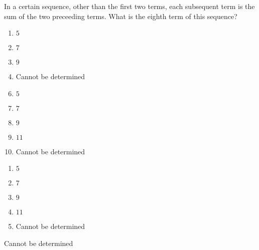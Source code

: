 






 In a certain sequence, other than the first two terms, each subsequent term is the sum of the two preceeding terms.  What is the eighth term of this sequence?


\ifsat
	\begin{enumerate}[label=\Alph*)]
		\item   $5$
		\item $7$
		\item   $9$
		\item   Cannot be determined%
	\end{enumerate}
\else
\fi

\ifacteven
	\begin{enumerate}[label=\textbf{\Alph*.},itemsep=\fill,align=left]
		\setcounter{enumii}{5}
		\item   $5$
		\item $7$
		\item   $9$
		\addtocounter{enumii}{1}
		\item  $11$
		\item   Cannot be determined%
	\end{enumerate}
\else
\fi

\ifactodd
	\begin{enumerate}[label=\textbf{\Alph*.},itemsep=\fill,align=left]
		\item   $5$
		\item $7$
		\item   $9$
		\item  $11$
		\item   Cannot be determined%
	\end{enumerate}
\else
\fi

\ifgridin
   Cannot be determined%

\else
\fi

